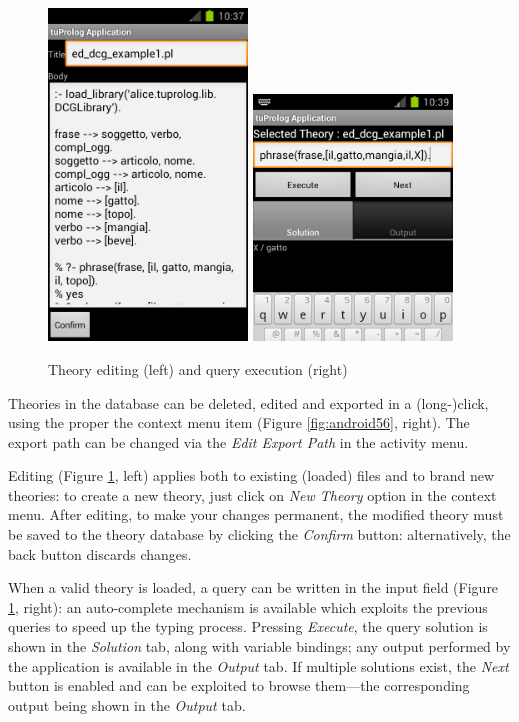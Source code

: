 \begin{figure}
  \includegraphics[width=200px]{images/android7.png}
  \includegraphics[width=200px]{images/android8.png}
  \caption{Theory editing (left) and query execution (right)}\label{fig:android78}
\end{figure}

Theories in the database can be deleted, edited and exported in a (long-)click, using the proper the context menu item (Figure \ref{fig:android56}, right). The export path can be changed via the \textit{Edit Export Path} in the activity menu.

Editing (Figure \ref{fig:android78}, left) applies both to existing (loaded) files and to brand new theories: to create a new theory, just click on \textit{New Theory} option in the context menu.
%
After editing, to make your changes permanent, the modified theory must be saved to the theory database by clicking the \textit{Confirm} button: alternatively, the back button discards changes.

When a valid theory is loaded, a query can be written in the input field (Figure \ref{fig:android78}, right): an auto-complete mechanism is available which exploits the previous queries to speed up the typing process.
%
Pressing \textit{Execute}, the query solution is shown in the \textit{Solution} tab, along with variable bindings; any output performed by the application is available in the \textit{Output} tab. If multiple solutions exist, the \textit{Next} button is enabled and can be exploited to browse them---the corresponding output being shown in the \textit{Output} tab.
